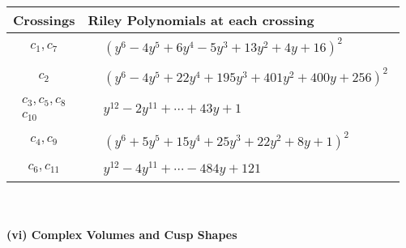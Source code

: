 \documentclass[1p]{elsarticle_modified}
\theoremstyle{definition}
\begin{document}
\begin{tabular}{m{50pt}|m{274pt}}
Crossings & \hspace{64pt}Riley Polynomials at each crossing \\
\hline $$\begin{aligned}c_{1},c_{7}\end{aligned}$$&$\begin{aligned}
&(y^6-4 y^5+6 y^4-5 y^3+13 y^2+4 y+16)^2
\end{aligned}$\\
\hline $$\begin{aligned}c_{2}\end{aligned}$$&$\begin{aligned}
&(y^6-4 y^5+22 y^4+195 y^3+401 y^2+400 y+256)^2
\end{aligned}$\\
\hline $$\begin{aligned}c_{3},c_{5},c_{8}\\c_{10}\end{aligned}$$&$\begin{aligned}
&y^{12}-2 y^{11}+\cdots+43 y+1
\end{aligned}$\\
\hline $$\begin{aligned}c_{4},c_{9}\end{aligned}$$&$\begin{aligned}
&(y^6+5 y^5+15 y^4+25 y^3+22 y^2+8 y+1)^2
\end{aligned}$\\
\hline $$\begin{aligned}c_{6},c_{11}\end{aligned}$$&$\begin{aligned}
&y^{12}-4 y^{11}+\cdots-484 y+121
\end{aligned}$\\
\hline
\end{tabular}\\~\\
\newpage\flushleft \textbf{(vi) Complex Volumes and Cusp Shapes}
\end{document}
